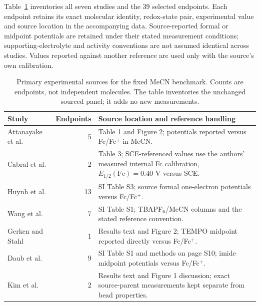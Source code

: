 \documentclass[11pt]{article}
\begin{document}
Table~\ref{tab:benchmark-sources} inventories all seven studies and the 39 selected endpoints. Each endpoint retains its exact molecular identity, redox-state pair, experimental value and source location in the accompanying data. Source-reported formal or midpoint potentials are retained under their stated measurement conditions; supporting-electrolyte and activity conventions are not assumed identical across studies. Values reported against another reference are used only with the source's own calibration.
\begin{table}[htbp]\centering\small
\caption{Primary experimental sources for the fixed MeCN benchmark. Counts are endpoints, not independent molecules. The table inventories the unchanged sourced panel; it adds no new measurements.}
\label{tab:benchmark-sources}
\begin{tabular}{p{.22\linewidth}rp{.60\linewidth}}\toprule
Study & Endpoints & Source location and reference handling\\\midrule
Attanayake et al.\cite{attanayake2019} & 5 & Table 1 and Figure 2; potentials reported versus Fc/Fc$^+$ in MeCN.\\
Cabral et al.\cite{cabral2023quinones} & 2 & Table 3; SCE-referenced values use the authors' measured internal Fc calibration, $E_{1/2}(\mathrm{Fc})=0.40$ V versus SCE.\\
Huynh et al.\cite{huynh2016quinones} & 13 & SI Table S3; source formal one-electron potentials versus Fc/Fc$^+$.\\
Wang et al.\cite{wang2020quinones} & 7 & SI Table S1; TBAPF$_6$/MeCN columns and the stated reference convention.\\
Gerken and Stahl\cite{gerken2015tempo} & 1 & Results text and Figure 2; TEMPO midpoint reported directly versus Fc/Fc$^+$.\\
Daub et al.\cite{daub2021imides} & 9 & SI Table S1 and methods on page S10; imide midpoint potentials versus Fc/Fc$^+$.\\
Kim et al.\cite{kim2022} & 2 & Results text and Figure 1 discussion; exact source-parent measurements kept separate from bead properties.\\\bottomrule
\end{tabular}\end{table}
\end{document}
